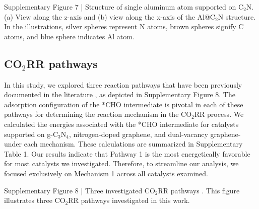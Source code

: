 Supplementary Figure 7 | Structure of single aluminum atom supported on C$_2$N. (a) View along the z-axis and (b) view along the x-axis of the Al@C$_2$N structure. In the illustrations, silver spheres represent N atoms, brown spheres signify C atoms, and blue sphere indicates Al atom.


\subsection{CO$_2$RR pathways}
In this study, we explored three reaction pathways that have been previously documented in the literature \cite{durand2011structure, nie2014reaction, peterson2010copper}, as depicted in Supplementary Figure 8.
The adsorption configuration of the *CHO intermediate is pivotal in each of these pathways for determining the reaction mechanism in the CO$_2$RR process.
We calculated the energies associated with the *CHO intermediate for catalysts supported on g-C$_3$N$_4$, nitrogen-doped graphene, and dual-vacancy graphene-under each mechanism.
These calculations are summarized in Supplementary Table 1.
Our results indicate that Pathway 1 is the most energetically favorable for most catalysts we investigated.
Therefore, to streamline our analysis, we focused exclusively on Mechanism 1 across all catalysts examined.

Supplementary Figure 8 | Three investigated CO$_2$RR pathways \cite{durand2011structure, nie2014reaction, peterson2010copper}. This figure illustrates three CO$_2$RR pathways investigated in this work.

